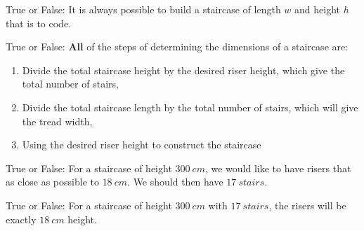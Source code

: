 \documentclass{ximera}
\author{Claire Merriman}
\begin{document}
\maketitle



\begin{exercise}
  True or False: It is always possible to build a staircase of length $w$ and height $h$ that is to code. 
\end{exercise}
\vfill

\begin{exercise}
   True or False: \textbf{All} of the steps of determining the dimensions of a staircase are:
   
\begin{enumerate}
 \item Divide the total staircase height by the desired riser height, which give the total number of stairs,
 \item Divide the total staircase length by the total number of stairs, which will give the tread width,
 \item Using the desired riser height to construct the staircase
\end{enumerate}
\end{exercise}


\begin{exercise} True or False: 
 For a staircase of height $300\ cm$, we would like to have risers that as close as possible to $18\ cm$. We should then have $17\ stairs$.
\end{exercise}

\begin{exercise} True or False: 
 For a staircase of height $300\ cm$ with $17\ stairs$, the risers will be exactly $18\ cm$ height.
\end{exercise}
\end{document}
